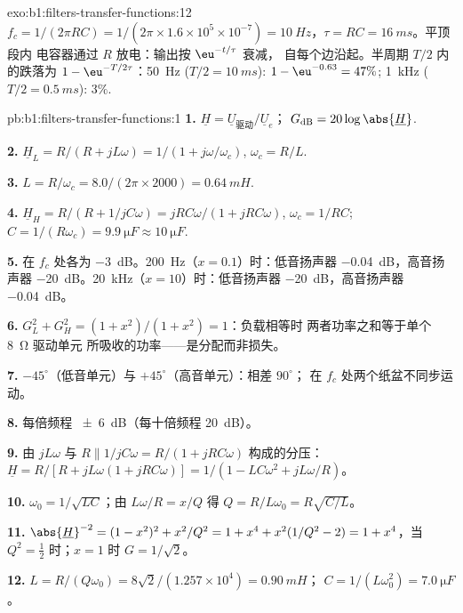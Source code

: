 \begin{solution}{exo:b1:filters-transfer-functions:12}
$f_c = 1/(2\pi RC) = 1/(2\pi \times 1.6\times10^5 \times 10^{-7}) =
\qty{10}{Hz}$，$\tau = RC = \qty{16}{ms}$。平顶段内
电容器通过 $R$ 放电：输出按 $\eu^{-t/\tau}$ 衰减，
自每个边沿起。半周期 $T/2$ 内的跌落为 $1 - \eu^{-T/2\tau}$：\qty{50}{Hz}
($T/2 = \qty{10}{ms}$): $1 - \eu^{-0.63} = 47\%$; \qty{1}{kHz}
($T/2 = \qty{0.5}{ms}$): $3\%$.
\end{solution}

\begin{solution}{pb:b1:filters-transfer-functions:1}
\textbf{1.} $\underline H = \underline U_{\text{驱动}}/\underline U_e$；
$G_{\mathrm{dB}} = 20\log\abs{\underline H}$.

\textbf{2.} $\underline H_L = R/(R + jL\omega) = 1/(1 + j\omega/\omega_c)$,
$\omega_c = R/L$.

\textbf{3.} $L = R/\omega_c = 8.0/(2\pi \times 2000) = \qty{0.64}{mH}$.

\textbf{4.} $\underline H_H = R/(R + 1/jC\omega) = jRC\omega/(1 + jRC\omega)$,
$\omega_c = 1/RC$; $C = 1/(R\omega_c) = \qty{9.9}{\micro F} \approx
\qty{10}{\micro F}$.

\textbf{5.} 在 $f_c$ 处各为 \qty{-3}{dB}。\qty{200}{Hz}（$x = 0.1$）时：低音扬声器
\qty{-0.04}{dB}，高音扬声器 \qty{-20}{dB}。\qty{20}{kHz}（$x = 10$）时：低音扬声器
\qty{-20}{dB}，高音扬声器 \qty{-0.04}{dB}。

\textbf{6.} $G_L^2 + G_H^2 = (1 + x^2)/(1 + x^2) = 1$：负载相等时
两者功率之和等于单个 \qty{8}{\ohm} 驱动单元
所吸收的功率——是分配而非损失。

\textbf{7.} $-45^\circ$（低音单元）与 $+45^\circ$（高音单元）：相差 $90^\circ$；
在 $f_c$ 处两个纸盆不同步运动。

\textbf{8.} 每倍频程 \qty{\pm 6}{dB}（每十倍频程 \qty{20}{dB}）。

\textbf{9.} 由 $jL\omega$ 与 $R \parallel 1/jC\omega =
R/(1 + jRC\omega)$ 构成的分压：$\underline H = R/[R + jL\omega(1 + jRC\omega)] =
1/(1 - LC\omega^2 + jL\omega/R)$。

\textbf{10.} $\omega_0 = 1/\sqrt{LC}$；由 $L\omega/R = x/Q$ 得 $Q =
R/L\omega_0 = R\sqrt{C/L}$。

\textbf{11.} $\abs{\underline H}^{-2} = (1 - x^2)^2 + x^2/Q^2 = 1 + x^4 +
x^2(1/Q^2 - 2) = 1 + x^4$，当 $Q^2 = \tfrac12$ 时；$x = 1$ 时 $G = 1/\sqrt2$。

\textbf{12.} $L = R/(Q\omega_0) = 8\sqrt2/(1.257\times10^4) = \qty{0.90}{mH}$；
$C = 1/(L\omega_0^2) = \qty{7.0}{\micro F}$。


\end{solution}
